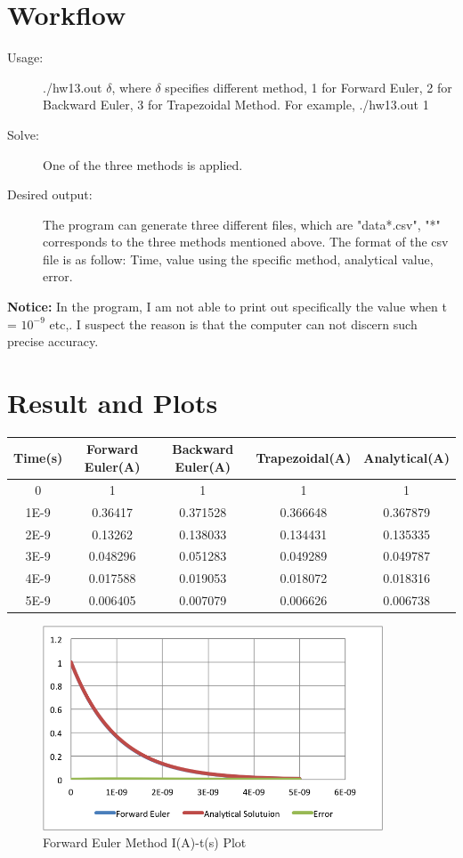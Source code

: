 \documentclass[12pt,a4paper]{book}
\begin{document}
\section{Workflow}
\begin{description}  
\item [Usage:] ./hw13.out  $\delta$, where $\delta$ specifies different method, 1 for Forward Euler, 2 for Backward Euler, 3 for Trapezoidal Method. For example,  ./hw13.out  1 
\item [Solve:] One of the three methods is applied.
\item[Desired output:] The program can generate three different files, which are "data*.csv", "*" corresponds to the three methods mentioned above. The format of the csv file is as follow: Time, value using the specific method, analytical value, error.

\end{description}
{\bf{Notice:}} In the program, I am not able to print out specifically the value when t = $10^{-9}$ etc,. I suspect the reason is that the computer can not discern such precise accuracy.
\section{Result and Plots}
\begin{center}
\begin{tabular}{|c|c|c|c|c|}
\hline  Time(s) & Forward Euler(A)  & Backward Euler(A) & Trapezoidal(A) & Analytical(A) \\
\hline    0    	&  1	& 1 &  1 &1\\
\hline    1E-9 &   0.36417  & 0.371528 &  0.366648 	&0.367879\\
\hline    2E-9 &  0.13262	& 0.138033 &    0.134431 	&0.135335\\
\hline    3E-9 &   0.048296  &  0.051283&   0.049289	&0.049787\\
\hline    4E-9 &  0.017588	& 0.019053 &   0.018072   &0.018316\\
\hline    5E-9 &   0.006405  & 0.007079 &  0.006626 	&0.006738\\\hline 
\end{tabular}
\end{center}

\newpage
\begin{figure}[h!]
  \centering
     \includegraphics[width=0.9\textwidth]{./forward.png}
  \caption{Forward Euler Method I(A)-t(s) Plot}
\end{figure}
\end{document}
